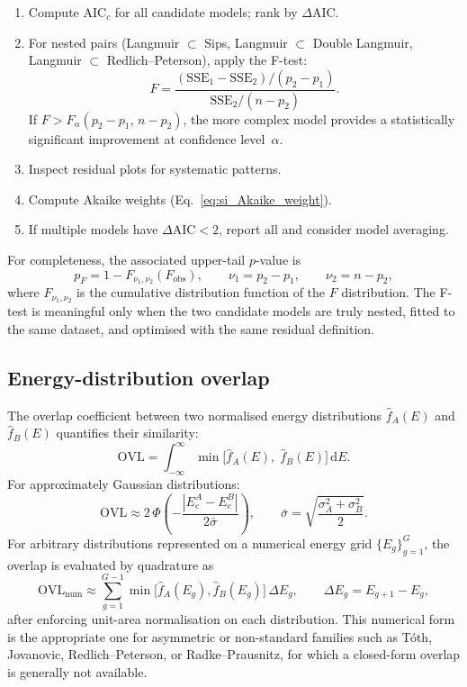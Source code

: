 \documentclass[journal=aamick,manuscript=article]{achemso}
\begin{document}
\begin{enumerate}
	\item Compute AIC$_c$ for all candidate models; rank by $\Delta$AIC.
	\item For nested pairs (Langmuir $\subset$ Sips, Langmuir
	$\subset$ Double Langmuir, Langmuir $\subset$ Redlich--Peterson),
	apply the F-test:
	\begin{equation}
		F = \frac{(\mathrm{SSE}_1 - \mathrm{SSE}_2)/(p_2 - p_1)}
		{\mathrm{SSE}_2/(n - p_2)}.
		\label{eq:si_Ftest}
	\end{equation}
	If $F > F_{\alpha}(p_2 - p_1,\, n - p_2)$, the more complex model
	provides a statistically significant improvement at confidence
	level~$\alpha$.
	\item Inspect residual plots for systematic patterns.
	\item Compute Akaike weights (Eq.~\ref{eq:si_Akaike_weight}).
	\item If multiple models have $\Delta\mathrm{AIC} < 2$,
	report all and consider model averaging.
\end{enumerate}
For completeness, the associated upper-tail $p$-value is
\begin{equation}
	p_F
	=
	1 - F_{\nu_1,\nu_2}(F_{\mathrm{obs}}),
	\qquad
	\nu_1 = p_2 - p_1,
	\qquad
	\nu_2 = n - p_2,
	\label{eq:si_Ftest_pvalue}
\end{equation}
where $F_{\nu_1,\nu_2}$ is the cumulative distribution function of the
$F$ distribution. The F-test is meaningful only when the two candidate
models are truly nested, fitted to the same dataset, and optimised with
the same residual definition.

\subsection{Energy-distribution overlap}
\label{sec:si_OVL}

The overlap coefficient between two normalised energy distributions
$\hat{f}_A(E)$ and $\hat{f}_B(E)$ quantifies their similarity:
\begin{equation}
	\mathrm{OVL}
	= \int_{-\infty}^{\infty}
	\min\!\bigl[\hat{f}_A(E),\;\hat{f}_B(E)\bigr]\,\mathrm{d}E.
	\label{eq:si_OVL}
\end{equation}
For approximately Gaussian distributions:
\begin{equation}
	\mathrm{OVL}
	\approx 2\,\Phi\!\left(
	-\frac{|E_c^A - E_c^B|}{2\bar{\sigma}}\right),
	\qquad
	\bar{\sigma} = \sqrt{\frac{\sigma_A^2 + \sigma_B^2}{2}}.
	\label{eq:si_OVL_gauss}
\end{equation}
For arbitrary distributions represented on a numerical energy grid
$\{E_g\}_{g=1}^{G}$, the overlap is evaluated by quadrature as
\begin{equation}
	\mathrm{OVL}_{\mathrm{num}}
	\approx
	\sum_{g=1}^{G-1}
	\min\!\bigl[\hat{f}_A(E_g), \hat{f}_B(E_g)\bigr]\,
	\Delta E_g,
	\qquad
	\Delta E_g = E_{g+1}-E_g,
	\label{eq:si_OVL_num}
\end{equation}
after enforcing unit-area normalisation on each distribution. This
numerical form is the appropriate one for asymmetric or non-standard
families such as T\'{o}th, Jovanovic, Redlich--Peterson, or
Radke--Prausnitz, for which a closed-form overlap is generally not
available.
\end{document}

